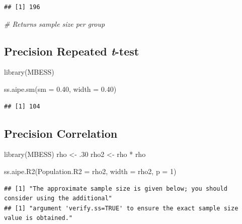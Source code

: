 \documentclass[
]{krantz}
\makeatletter
\newenvironment{Shaded}{\begin{snugshade}}{\end{snugshade}}
\newcommand{\AttributeTok}[1]{\textcolor[rgb]{0.61,0.61,0.61}{#1}}
\newcommand{\CommentTok}[1]{\textcolor[rgb]{0.37,0.37,0.37}{\textit{#1}}}
\newcommand{\DecValTok}[1]{\textcolor[rgb]{0.06,0.06,0.06}{#1}}
\newcommand{\FloatTok}[1]{\textcolor[rgb]{0.06,0.06,0.06}{#1}}
\newcommand{\FunctionTok}[1]{\textcolor[rgb]{0,0,0}{#1}}
\newcommand{\NormalTok}[1]{#1}
\newcommand{\OtherTok}[1]{\textcolor[rgb]{0.37,0.37,0.37}{#1}}
\newcommand{\SpecialCharTok}[1]{\textcolor[rgb]{0,0,0}{#1}}
\newenvironment{kframe}{%
\medskip{}
\setlength{\fboxsep}{.8em}
 \def\at@end@of@kframe{}%
 \ifinner\ifhmode%
  \def\at@end@of@kframe{\end{minipage}}%
  \begin{minipage}{\columnwidth}%
 \fi\fi%
 \def\FrameCommand##1{\hskip\@totalleftmargin \hskip-\fboxsep
 \colorbox{shadecolor}{##1}\hskip-\fboxsep
     \hskip-\linewidth \hskip-\@totalleftmargin \hskip\columnwidth}%
 \MakeFramed {\advance\hsize-\width
   \@totalleftmargin\z@ \linewidth\hsize
   \@setminipage}}%
 {\par\unskip\endMakeFramed%
 \at@end@of@kframe}
\renewenvironment{Shaded}{\begin{kframe}}{\end{kframe}}
\makeatother
\begin{document}
\begin{verbatim}
## [1] 196
\end{verbatim}

\begin{Shaded}
\begin{Highlighting}[]
\CommentTok{\# Returns sample size per group}
\end{Highlighting}
\end{Shaded}

\hypertarget{precision-repeated-t-test}{%
\subsection{\texorpdfstring{Precision Repeated \emph{t}-test}{Precision Repeated t-test}}\label{precision-repeated-t-test}}

\begin{Shaded}
\begin{Highlighting}[]
\FunctionTok{library}\NormalTok{(MBESS)}

\FunctionTok{ss.aipe.sm}\NormalTok{(}\AttributeTok{sm =} \FloatTok{0.40}\NormalTok{,}
            \AttributeTok{width =} \FloatTok{0.40}\NormalTok{)}
\end{Highlighting}
\end{Shaded}

\begin{verbatim}
## [1] 104
\end{verbatim}

\hypertarget{precision-correlation}{%
\subsection{Precision Correlation}\label{precision-correlation}}

\begin{Shaded}
\begin{Highlighting}[]
\FunctionTok{library}\NormalTok{(MBESS)}
\NormalTok{rho }\OtherTok{\textless{}{-}}\NormalTok{ .}\DecValTok{30}
\NormalTok{rho2 }\OtherTok{\textless{}{-}}\NormalTok{ rho }\SpecialCharTok{*}\NormalTok{ rho}

\FunctionTok{ss.aipe.R2}\NormalTok{(}\AttributeTok{Population.R2 =}\NormalTok{ rho2, }
           \AttributeTok{width =}\NormalTok{ rho2,}
           \AttributeTok{p =} \DecValTok{1}\NormalTok{)}
\end{Highlighting}
\end{Shaded}

\begin{verbatim}
## [1] "The approximate sample size is given below; you should consider using the additional"
## [1] "argument 'verify.ss=TRUE' to ensure the exact sample size value is obtained."
\end{verbatim}
\end{document}
